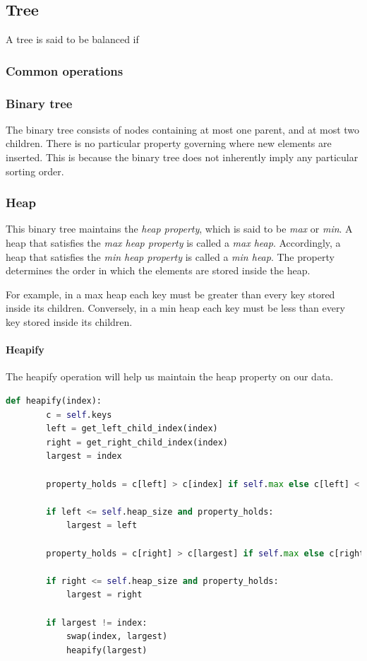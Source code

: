 \documentclass{article}
\begin{document}
\newpage

\subsection{Tree}
A tree is said to be balanced if

\subsubsection{Common operations}
\subsubsection{Binary tree}
The binary tree consists of nodes containing at most one parent, and at most two children.
There is no particular property governing where new elements are inserted.
This is because the binary tree does not inherently imply any particular sorting order.

\subsubsection{Heap}
This binary tree maintains the {\em heap property}, which is said to be {\em max} or {\em min}.
A heap that satisfies the {\em max heap property} is called a {\em max heap}.
Accordingly, a heap that satisfies the {\em min heap property} is called a {\em min heap}.
The property determines the order in which the elements are stored inside the heap.

For example, in a max heap each key must be greater than every key stored inside its children.
Conversely, in a min heap each key must be less than every key stored inside its children.

\paragraph{Heapify}
The heapify operation will help us maintain the heap property on our data.

\begin{lstlisting}[language=Python]
  def heapify(index):
        c = self.keys
        left = get_left_child_index(index)
        right = get_right_child_index(index)
        largest = index

        property_holds = c[left] > c[index] if self.max else c[left] < c[index]
        
        if left <= self.heap_size and property_holds:
            largest = left

        property_holds = c[right] > c[largest] if self.max else c[right] < c[largest]
        
        if right <= self.heap_size and property_holds:
            largest = right
        
        if largest != index:
            swap(index, largest)
            heapify(largest)
\end{lstlisting}
\end{document}
